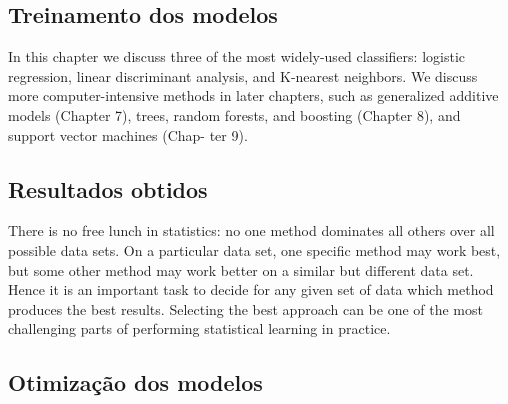 






		\subsection{Treinamento dos modelos}

		In this chapter we discuss three of the most
widely-used classifiers: logistic regression, linear discriminant analysis, and
K-nearest neighbors. We discuss more computer-intensive methods in later
chapters, such as generalized additive models (Chapter 7), trees, random
forests, and boosting (Chapter 8), and support vector machines (Chap-
ter 9).

		\subsection{Resultados obtidos}

		There
		is no free lunch in statistics: no one method dominates all others over all
		possible data sets. On a particular data set, one specific method may work
		best, but some other method may work better on a similar but different
		data set. Hence it is an important task to decide for any given set of data
		which method produces the best results. Selecting the best approach can
		be one of the most challenging parts of performing statistical learning in
		practice.


		\subsection{Otimização dos modelos}

